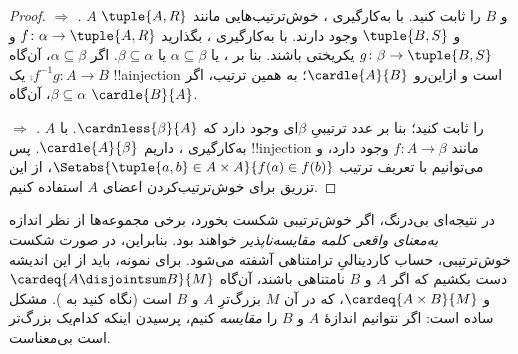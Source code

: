 \documentclass[../../../include/open-logic-section]{subfiles}
\begin{document}
\begin{proof}
\emph{ $\Rightarrow$ .}
$A$ و $B$ را ثابت کنید. با به‌کارگیری ،
خوش‌ترتیب‌هایی مانند $\tuple{A, R}$ و $\tuple{B, S}$ وجود دارند.
با به‌کارگیری
، بگذارید
$f \colon \alpha \to \tuple{A, R}$ و
$g \colon \beta \to \tuple{B, S}$ یکریختی باشند. بنا بر
، یا
$\alpha \subseteq \beta$ یا $\beta \subseteq \alpha$. اگر
$\alpha \subseteq \beta$، آن‌گاه
$\comp{f^{-1}}{g} \colon A \to B$ یک !!a{injection} است و ازاین‌رو
$\cardle{A}{B}$؛ به همین ترتیب، اگر
$\beta \subseteq \alpha$، آن‌گاه $\cardle{B}{A}$.

\emph{ $\Rightarrow$ .}
$A$ را ثابت کنید؛ بنا بر  عدد ترتیبیِ
$\beta$ای وجود دارد که $\cardnless{\beta}{A}$. با به‌کارگیری
، داریم $\cardle{A}{\beta}$. پس
!!{injection} مانند $f \colon A \to \beta$ وجود دارد، و می‌توانیم
با تعریف ترتیب
$\Setabs{\tuple{a, b} \in A \times A}{f(a) \in f(b)}$، از این تزریق
برای خوش‌ترتیب‌کردن اعضای $A$ استفاده کنیم.
\end{proof}
\noindent
در نتیجه‌ای بی‌درنگ، اگر خوش‌ترتیبی شکست بخورد، برخی مجموعه‌ها از
نظر اندازه \emph{به‌معنای واقعی کلمه مقایسه‌ناپذیر} خواهند بود.
بنابراین، در صورت شکست خوش‌ترتیبی، حساب کاردینالیِ ترامتناهی آشفته
می‌شود. برای نمونه، باید از این اندیشه دست بکشیم که اگر $A$ و $B$
نامتناهی باشند، آن‌گاه $\cardeq{A \disjointsum B}{M}$ و
$\cardeq{A \times B}{M}$، که در آن $M$ بزرگ‌ترِ $A$ و $B$ است
(نگاه کنید به
). مشکل ساده است:
اگر نتوانیم اندازهٔ $A$ و $B$ را \emph{مقایسه} کنیم، پرسیدن اینکه
کدام‌یک بزرگ‌تر است بی‌معناست.
\end{document}
